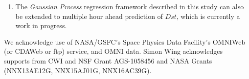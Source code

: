\documentclass[sw, draft]{AGUTeX}
\begin{document}
\begin{article}
\begin{enumerate}
      \item The \emph{Gaussian Process} regression framework described in this study can also be extended to multiple hour ahead prediction of $Dst$, which is currently a work in progress.
\end{enumerate}





%
%
%
%
%

%

\begin{acknowledgments}
We acknowledge use of NASA/GSFC's Space Physics Data Facility's OMNIWeb (or CDAWeb or ftp) service, and OMNI data. Simon Wing acknowledges supports from CWI and NSF Grant AGS-1058456 and NASA Grants (NNX13AE12G, NNX15AJ01G, NNX16AC39G).
\end{acknowledgments}

%
%
%
%
%
%
%
%
%




\end{article}
\end{document}
